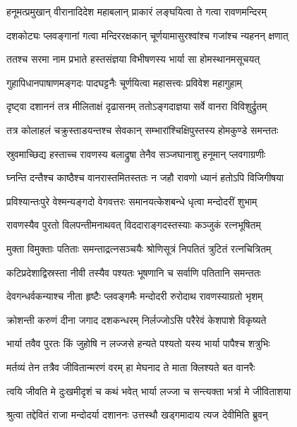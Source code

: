 \twolineshloka
{हनूमत्प्रमुखान् वीरानादिदेश महाबलान्}
{प्राकारं लङ्घयित्वा ते गत्वा रावणमन्दिरम्} %

\twolineshloka
{दशकोट्यः प्लवङ्गानां गत्वा मन्दिररक्षकान्}
{चूर्णयामासुरश्वांश्च गजांश्च न्यहनन् क्षणात्} %

\twolineshloka
{ततश्च सरमा नाम प्रभाते हस्तसंज्ञया}
{विभीषणस्य भार्या सा होमस्थानमसूचयत्} %

\twolineshloka
{गुहापिधानपाषाणमङ्गदः पादघट्टनैः}
{चूर्णयित्वा महासत्त्वः प्रविवेश महागुहाम्} %

\twolineshloka
{दृष्ट्वा दशाननं तत्र मीलिताक्षं दृढासनम्}
{ततोऽङ्गदाज्ञया सर्वे वानरा विविशुर्द्रुतम्} %

\twolineshloka
{तत्र कोलाहलं चक्रुस्ताडयन्तश्च सेवकान्}
{सम्भारांश्चिक्षिपुस्तस्य होमकुण्डे समन्ततः} %

\twolineshloka
{स्रुवमाच्छिद्य हस्ताच्च रावणस्य बलाद्रुषा}
{तेनैव सञ्जघानाशु हनूमान् प्लवगाग्रणीः} %

\twolineshloka
{घ्नन्ति दन्तैश्च काष्ठैश्च वानरास्तमितस्ततः}
{न जहौ रावणो ध्यानं हतोऽपि विजिगीषया} %

\twolineshloka
{प्रविश्यान्तःपुरे वेश्मन्यङ्गदो वेगवत्तरः}
{समानयत्केशबन्धे धृत्वा मन्दोदरीं शुभाम्} %

\twolineshloka
{रावणस्यैव पुरतो विलपन्तीमनाथवत्}
{विददाराङ्गदस्तस्याः कञ्जुकं रत्नभूषितम्} %

\twolineshloka
{मुक्ता विमुक्ताः पतिताः समन्ताद्रत्नसञ्चयैः}
{श्रोणिसूत्रं निपतितं त्रुटितं रत्नचित्रितम्} %

\twolineshloka
{कटिप्रदेशाद्विस्रस्ता नीवी तस्यैव पश्यतः}
{भूषणानि च सर्वाणि पतितानि समन्ततः} %

\twolineshloka
{देवगन्धर्वकन्याश्च नीता हृष्टैः प्लवङ्गमैः}
{मन्दोदरी रुरोदाथ रावणस्याग्रतो भृशम्} %

\twolineshloka
{क्रोशन्ती करुणं दीना जगाद दशकन्धरम्}
{निर्लज्जोऽसि परैरेवं केशपाशे विकृष्यते} %

\twolineshloka
{भार्या तवैव पुरतः किं जुहोषि न लज्जसे}
{हन्यते पश्यतो यस्य भार्या पापैश्च शत्रुभिः} %

\twolineshloka
{मर्तव्यं तेन तत्रैव जीवितान्मरणं वरम्}
{हा मेघनाद ते माता क्लिश्यते बत वानरैः} %

\twolineshloka
{त्वयि जीवति मे दुःखमीदृशं च कथं भवेत्}
{भार्या लज्जा च सन्त्यक्ता भर्त्रा मे जीविताशया} %

\twolineshloka
{श्रुत्वा तद्देवितं राजा मन्दोदर्या दशाननः}
{उत्तस्थौ खड्गमादाय त्यज देवीमिति ब्रुवन्} %

